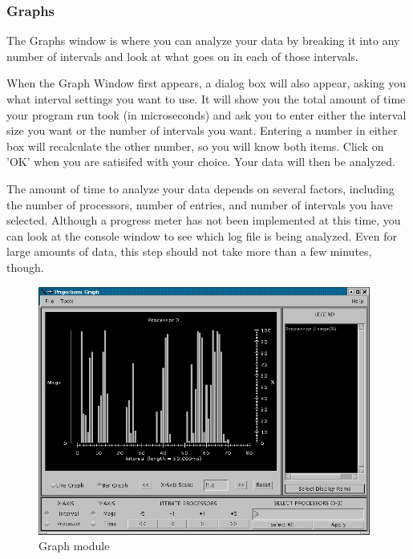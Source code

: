 \documentclass[10pt]{article}
\begin{document}
\subsubsection{Graphs}
\label{sec::graph view}
The Graphs window is where you can analyze your data by breaking it
into any number of intervals and look at what goes on in each of those
intervals.

When the Graph Window first appears, a dialog box will also appear,
asking you what interval settings you want to use.  It will show you
the total amount of time your program run took (in microseconds) and
ask you to enter either the interval size you want or the number of
intervals you want.  Entering a number in either box will recalculate
the other number, so you will know both items. Click on 'OK' when you
are satisifed with your choice.  Your data will then be analyzed.

The amount of time to analyze your data depends on several factors,
including the number of processors, number of entries, and number of
intervals you have selected.  Although a progress meter has not been
implemented at this time, you can look at the console window to see
which log file is being analyzed.  Even for large amounts of data,
this step should not take more than a few minutes, though.

\begin{figure}[hbt]
\center
\includegraphics[width=4.3in]{fig/graph}
\caption{Graph module}
\label{graph}
\end{figure}
\end{document}

